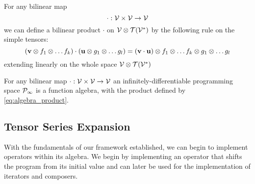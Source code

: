 \begin{definition}
 For any bilinear map
 $$\cdot :\mathcal{V}\times \mathcal{V}\to \mathcal{V}$$
 we can define a
 bilinear product $\cdot$ on $\mathcal{V}\otimes \mathcal{T}(\mathcal{V}^*)$ by the following rule on the
 simple tensors:
 \begin{equation}
   \label{eq:algebra_product}
   (\mathbf{v}\otimes f_1\otimes\ldots f_k) \cdot (\mathbf{u}\otimes g_1\otimes\ldots g_l)=
(\mathbf{v}\cdot \mathbf{u})\otimes f_1\otimes\ldots f_k\otimes g_1\otimes\ldots g_l 
 \end{equation}
extending linearly on the whole space $\mathcal{V}\otimes\mathcal{T}(\mathcal{V}^*)$
\end{definition}
\begin{theorem}\label{izr:alg}
 For any bilinear map $\cdot :\mathcal{V}\times \mathcal{V}\to \mathcal{V}$ an infinitely-differentiable
 programming space $\mathcal{P}_\infty$ is a function algebra, with the product defined
 by \eqref{eq:algebra_product}.
\end{theorem}

 \subsection{Tensor Series Expansion}\label{sec:Vrsta}

With the fundamentals of our framework established, we can begin to implement operators within its algebra. We begin by implementing an operator that shifts the program from its initial value and can later be used for the implementation of iterators and composers.

